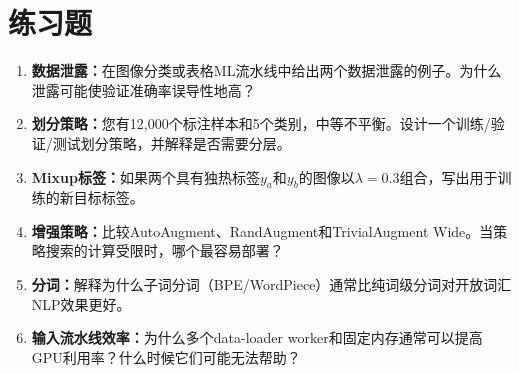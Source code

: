 \section{练习题}

\begin{enumerate}
    \item \textbf{数据泄露：}在图像分类或表格ML流水线中给出两个数据泄露的例子。为什么泄露可能使验证准确率误导性地高？

    \item \textbf{划分策略：}您有12,000个标注样本和5个类别，中等不平衡。设计一个训练/验证/测试划分策略，并解释是否需要分层。

    \item \textbf{Mixup标签：}如果两个具有独热标签$y_a$和$y_b$的图像以$\lambda = 0.3$组合，写出用于训练的新目标标签。

    \item \textbf{增强策略：}比较AutoAugment、RandAugment和TrivialAugment Wide。当策略搜索的计算受限时，哪个最容易部署？

    \item \textbf{分词：}解释为什么子词分词（BPE/WordPiece）通常比纯词级分词对开放词汇NLP效果更好。

    \item \textbf{输入流水线效率：}为什么多个data-loader worker和固定内存通常可以提高GPU利用率？什么时候它们可能无法帮助？
\end{enumerate}
